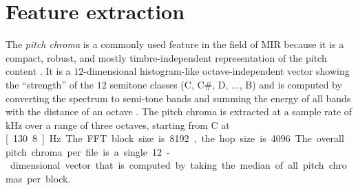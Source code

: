 \documentclass{article}
\begin{document}

\section{Feature extraction}\label{sec:pitch_chroma}

The \textit{pitch chroma} is a commonly used feature in the field of MIR  because it is a compact, robust, and mostly timbre-independent representation of the pitch content  \cite{muller_information_2007}. It is a $12$-dimensional histogram-like octave-independent vector showing the ``strength'' of the $12$ semitone classes (C, C\#, D, ..., B) and is computed by converting the spectrum to semi-tone bands and summing the energy of all bands with the distance of an octave \cite{fujishima_realtime_1999}. 
The pitch chroma is extracted at a sample rate of \unit[10]{kHz} over a range of three octaves, starting from C at \unit[130.8]{Hz}. The FFT block size is 8192, the hop size is 4096.
The overall pitch chroma per file is a single 12-dimensional vector that is computed by taking the median of all pitch chromas per block. 

\end{document}
